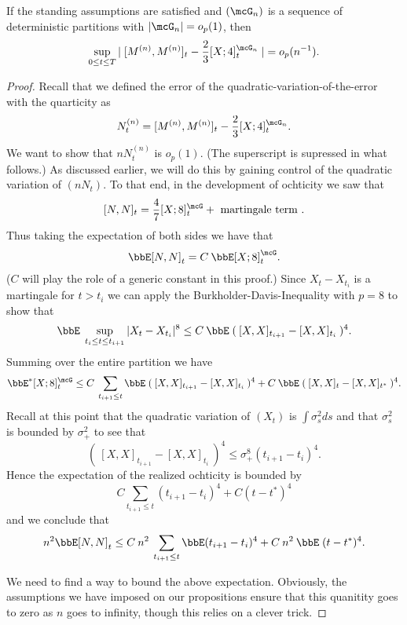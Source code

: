 \documentclass{report}
\begin{document}
\begin{proposition}
If the standing assumptions are satisfied and $(\mcG_n)$ is a sequence
of deterministic partitions with $|\mcG_n| = o_p(1)$, then
\[
\sup_{0 \leq t \leq T} | \; [M^{(n)},M^{(n)}]_t - \frac{2}{3}
[X;4]^{\mcG_n}_t \; | = o_p(n^{-1}).
\]
\end{proposition}

\begin{proof}
Recall that we defined the error of the
quadratic-variation-of-the-error with the quarticity as
\[
N^{(n)}_t =  [M^{(n)},M^{(n)}]_t - \frac{2}{3} [X;4]^{\mcG_n}_t .
\]
We want to show that $n N^{(n)}_t$ is $o_p(1)$.  (The superscript is
supressed in what follows.)  As discussed earlier, we will do this by
gaining control of the quadratic variation of $(n N_t)$.  To that end,
in the development of ochticity we saw that
\[
[N,N]_t = \frac{4}{7}[X;8]^{\mcG}_t + \textmd{ martingale term }.
\]
Thus taking the expectation of both sides we have that
\[
\bbE [N,N]_t = C \: \bbE [X;8]^\mcG_t.
\]
($C$ will play the role of a generic constant in this proof.)  
Since $X_t - X_{t_i}$ is a martingale for $t > t_i$ we can apply the
Burkholder-Davis-Inequality with $p=8$ to show that
\[
\bbE \; \sup_{t_i \leq t \leq t_{i+1}} |X_t - X_{t_i}|^8  \leq C \:
\bbE \; ( \:[X,X]_{t_{i+1}} - [X,X]_{t_i} \: )^4.
\]
Summing over the entire partition we have
\[
\bbE^* [X;8]^\mcG_t \leq C \: \sum_{t_{i+1} \leq t} \bbE \; (
\:[X,X]_{t_{i+1}} - [X,X]_{t_i} \: )^4 + C \: \bbE \; ( \:[X,X]_{t} -  
[X,X]_{t^*} \: )^4 .
\]
Recall at this point that the quadratic variation of $(X_t)$ is $\int
\sigma^2_s ds$ and that $\sigma_s^2$ is bounded by $\sigma_+^2$ to see
that
\[
( \:[X,X]_{t_{i+1}} - [X,X]_{t_i} \: )^4 \leq \sigma_+^8 ( t_{i+1} -
t_i)^4.
\]
Hence the expectation of the realized ochticity is bounded by
\[
C \sum_{t_{i+1} \leq t} ( t_{i+1} - t_i)^4 + C ( t - t^*)^4
\]
and we conclude that
\[
n^2 \bbE [N,N]_t \leq C \: n^2 \: \sum_{t_{i+1} \leq t} \bbE (  
t_{i+1} - t_i)^4 + C \: n^2 \: \bbE \; ( t - t^*)^4 .
\]

We need to find a way to bound the above expectation.  Obviously, the
assumptions we have imposed on our propositions ensure that this
quanitity goes to zero as $n$ goes to infinity, though this relies on 
a clever trick.  


\end{proof}
\end{document}
